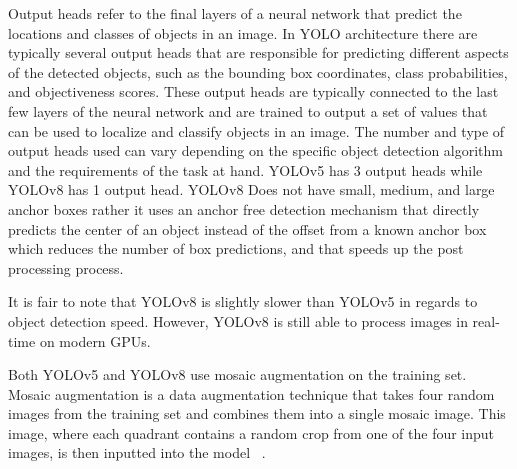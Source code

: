\documentclass[10pt,twocolumn,letterpaper]{article}
\begin{document}
Output heads refer to the final layers of a neural network that predict the locations and classes of objects in an image. In YOLO architecture there are typically several output heads that are responsible for predicting different aspects of the detected objects, such as the bounding box coordinates, class probabilities, and objectiveness scores. These output heads are typically connected to the last few layers of the neural network and are trained to output a set of values that can be used to localize and classify objects in an image. The number and type of output heads used can vary depending on the specific object detection algorithm and the requirements of the task at hand. YOLOv5 has 3 output heads while YOLOv8 has 1 output head. YOLOv8 Does not have small, medium, and large anchor boxes rather it uses an anchor free detection mechanism that directly predicts the center of an object instead of the offset from a known anchor box which reduces the number of box predictions, and that speeds up the post processing process.

It is fair to note that YOLOv8 is slightly slower than YOLOv5 in regards to object detection speed. However, YOLOv8 is still able to process images in real-time on modern GPUs.

Both YOLOv5 and YOLOv8 use mosaic augmentation on the training set. Mosaic augmentation is a data augmentation technique that takes four random images from the training set and combines them into a single mosaic image. This image, where each quadrant contains a random crop from one of the four input images, is then inputted into the model ~\cite{MosaicAug}.

\clearpage
\newpage
														 
\end{document}
